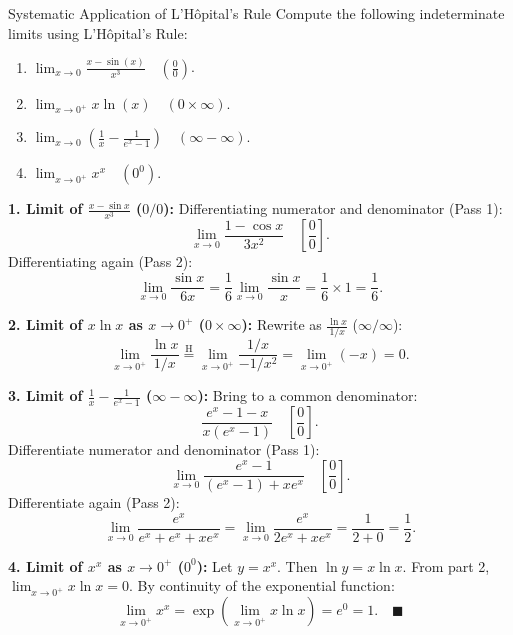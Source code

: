 \begin{exercise}{Systematic Application of L'Hôpital's Rule}
Compute the following indeterminate limits using L'Hôpital's Rule:
\begin{enumerate}[leftmargin=1.5em,itemsep=2pt]
  \item $\lim_{x \to 0} \frac{x - \sin(x)}{x^3} \quad \left(\frac{0}{0}\right)$.
  \item $\lim_{x \to 0^+} x \ln(x) \quad (0 \times \infty)$.
  \item $\lim_{x \to 0} \left( \frac{1}{x} - \frac{1}{e^x - 1} \right) \quad (\infty - \infty)$.
  \item $\lim_{x \to 0^+} x^x \quad (0^0)$.
\end{enumerate}
\end{exercise}

\begin{tabletworkspace}[5.0cm]
\end{tabletworkspace}

\begin{solution}
\textbf{1. Limit of $\frac{x - \sin x}{x^3}$ ($0/0$):}
Differentiating numerator and denominator (Pass 1):
\[
\lim_{x \to 0} \frac{1 - \cos x}{3x^2} \quad \left[\frac{0}{0}\right].
\]
Differentiating again (Pass 2):
\[
\lim_{x \to 0} \frac{\sin x}{6x} = \frac{1}{6} \lim_{x \to 0} \frac{\sin x}{x} = \frac{1}{6} \times 1 = \frac{1}{6}.
\]

\textbf{2. Limit of $x \ln x$ as $x \to 0^+$ ($0 \times \infty$):}
Rewrite as $\frac{\ln x}{1/x}$ ($\infty / \infty$):
\[
\lim_{x \to 0^+} \frac{\ln x}{1/x} \stackrel{\text{H}}{=} \lim_{x \to 0^+} \frac{1/x}{-1/x^2} = \lim_{x \to 0^+} (-x) = 0.
\]

\textbf{3. Limit of $\frac{1}{x} - \frac{1}{e^x - 1}$ ($\infty - \infty$):}
Bring to a common denominator:
\[
\frac{e^x - 1 - x}{x(e^x - 1)} \quad \left[\frac{0}{0}\right].
\]
Differentiate numerator and denominator (Pass 1):
\[
\lim_{x \to 0} \frac{e^x - 1}{(e^x - 1) + x e^x} \quad \left[\frac{0}{0}\right].
\]
Differentiate again (Pass 2):
\[
\lim_{x \to 0} \frac{e^x}{e^x + e^x + x e^x} = \lim_{x \to 0} \frac{e^x}{2e^x + x e^x} = \frac{1}{2 + 0} = \frac{1}{2}.
\]

\textbf{4. Limit of $x^x$ as $x \to 0^+$ ($0^0$):}
Let $y = x^x$. Then $\ln y = x \ln x$.
From part 2, $\lim_{x \to 0^+} x \ln x = 0$.
By continuity of the exponential function:
\[
\lim_{x \to 0^+} x^x = \exp\left(\lim_{x \to 0^+} x \ln x\right) = e^0 = 1. \quad \blacksquare
\]
\end{solution}

